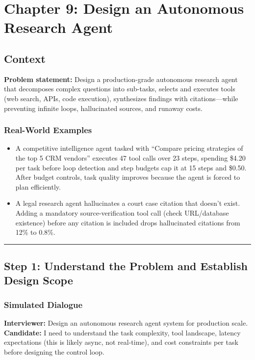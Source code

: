 \chapter{Chapter 9: Design an Autonomous Research Agent}

\section*{Context}

\textbf{Problem statement:} Design a production-grade autonomous research agent that decomposes complex questions into sub-tasks, selects and executes tools (web search, APIs, code execution), synthesizes findings with citations---while preventing infinite loops, hallucinated sources, and runaway costs.

\subsection*{Real-World Examples}

\begin{itemize}
  \item A competitive intelligence agent tasked with ``Compare pricing strategies of the top 5 CRM vendors'' executes 47 tool calls over 23 steps, spending \$4.20 per task before loop detection and step budgets cap it at 15 steps and \$0.50. After budget controls, task quality improves because the agent is forced to plan efficiently.
  \item A legal research agent hallucinates a court case citation that doesn't exist. Adding a mandatory source-verification tool call (check URL/database existence) before any citation is included drops hallucinated citations from 12\% to 0.8\%.
\end{itemize}

\bigskip\hrule\bigskip

\section*{Step 1: Understand the Problem and Establish Design Scope}

\subsection*{Simulated Dialogue}

\textbf{Interviewer:} Design an autonomous research agent system for production scale.\\
\textbf{Candidate:} I need to understand the task complexity, tool landscape, latency expectations (this is likely async, not real-time), and cost constraints per task before designing the control loop.

